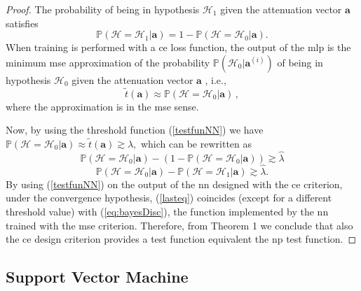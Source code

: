 \documentclass[draftcls,onecolumn,12pt]{IEEEtran}
\begin{document}
\begin{proof}
The probability of being in hypothesis $\mathcal{H}_1$ given the attenuation vector $\bm{a}$ satisfies
\begin{equation}
    \mathbb{P}(\mathcal{H} = \mathcal{H}_1|\bm{a} ) = 1- \mathbb{P}(\mathcal{H} = \mathcal{H}_0|\bm{a} ).
\end{equation}
When training is performed with a \ac{ce} loss function, the output of the \ac{mlp} is the minimum \ac{mse} approximation of the probability $\mathbb{P}(\mathcal{H}_0|\bm{a}^{(i)})$ of being in hypothesis $\mathcal{H}_0$ given the attenuation vector $\bm{a}$ \underline{\cite[Chapter~5.2]{Bishop2006}}, i.e.,
\begin{equation}
    \tilde{t}(\bm{a}) \approx \mathbb{P}(\mathcal{H}=\mathcal{H}_0|\bm{a})\,,
\end{equation} 
where the approximation is in the \ac{mse} sense. 

Now, by using the threshold function (\ref{testfunNN}) we have $
    \mathbb{P}(\mathcal{H}=\mathcal{H}_0|\bm{a}) \approx  \tilde{t}(\bm{a}) \gtrsim \lambda,
$ which can be rewritten as
\begin{equation}
    \mathbb{P}(\mathcal{H}=\mathcal{H}_0|\bm{a} )-(1-\mathbb{P}(\mathcal{H}=\mathcal{H}_0|\bm{a} )) \gtrsim \hat{\lambda}
\end{equation}
\begin{equation}
\label{lasteq}
    \mathbb{P}(\mathcal{H}=\mathcal{H}_0|\bm{a} )-\mathbb{P}(\mathcal{H}=\mathcal{H}_1|\bm{a} ) \gtrsim \hat{\lambda}.
\end{equation}
By using (\ref{testfunNN}) on the output of the \ac{nn} designed with the \ac{ce} criterion, under the convergence hypothesis, (\ref{lasteq}) coincides (except for a different threshold value) with (\ref{eq:bayesDisc}), the function implemented by the \ac{nn} trained with the \ac{mse} criterion. Therefore, from Theorem 1 we conclude that also the \ac{ce} design criterion provides a test function equivalent the \ac{np} test function.
\end{proof}

\subsection{Support Vector Machine}\label{sec:svm}
\end{document}
